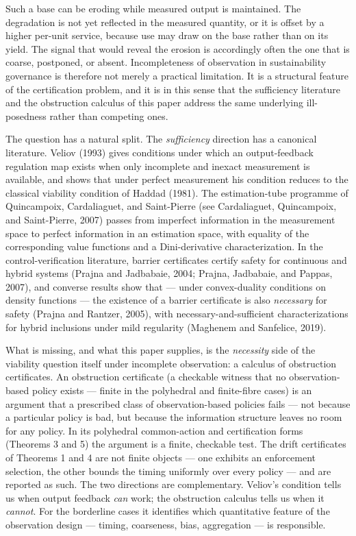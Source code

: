 \documentclass[11pt]{article}
\begin{document}
Such a base can be eroding while measured output is maintained. The
degradation is not yet reflected in the measured quantity, or it is
offset by a higher per-unit service, because use may draw on the base
rather than on its yield. The signal that would reveal the erosion is
accordingly often the one that is coarse, postponed, or absent.
Incompleteness of observation in sustainability governance is therefore
not merely a practical limitation. It is a structural feature of the
certification problem, and it is in this sense that the sufficiency
literature and the obstruction calculus of this paper address the same
underlying ill-posedness rather than competing ones.

The question has a natural split. The \emph{sufficiency} direction has a
canonical literature. Veliov (1993) gives conditions under which an
output-feedback regulation map exists when only incomplete and inexact
measurement is available, and shows that under perfect measurement his
condition reduces to the classical viability condition of Haddad (1981).
The estimation-tube programme of Quincampoix, Cardaliaguet, and
Saint-Pierre (see Cardaliaguet, Quincampoix, and Saint-Pierre, 2007)
passes from imperfect information in the measurement space to perfect
information in an estimation space, with equality of the corresponding
value functions and a Dini-derivative characterization. In the
control-verification literature, barrier certificates certify safety for
continuous and hybrid systems (Prajna and Jadbabaie, 2004; Prajna,
Jadbabaie, and Pappas, 2007), and converse results show that --- under
convex-duality conditions on density functions --- the existence of a
barrier certificate is also \emph{necessary} for safety (Prajna and
Rantzer, 2005), with necessary-and-sufficient characterizations for
hybrid inclusions under mild regularity (Maghenem and Sanfelice, 2019).

What is missing, and what this paper supplies, is the \emph{necessity}
side of the viability question itself under incomplete observation: a
calculus of obstruction certificates. An obstruction certificate (a
checkable witness that no observation-based policy exists --- finite in
the polyhedral and finite-fibre cases) is an argument that a prescribed
class of observation-based policies fails --- not because a particular
policy is bad, but because the information structure leaves no room for
any policy. In its polyhedral common-action and certification forms
(Theorems 3 and 5) the argument is a finite, checkable test. The drift
certificates of Theorems 1 and 4 are not finite objects --- one exhibits
an enforcement selection, the other bounds the timing uniformly over
every policy --- and are reported as such. The two directions are
complementary. Veliov's condition tells us when output feedback
\emph{can} work; the obstruction calculus tells us when it
\emph{cannot}. For the borderline cases it identifies which quantitative
feature of the observation design --- timing, coarseness, bias,
aggregation --- is responsible.
\end{document}
